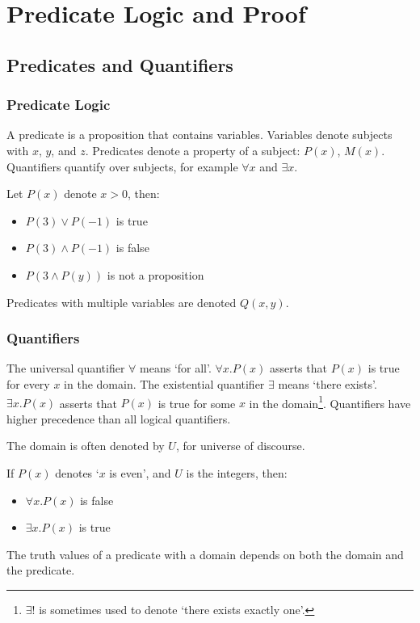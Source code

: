 \chapter{Predicate Logic and Proof}

\section{Predicates and Quantifiers}
\subsection{Predicate Logic}
A predicate is a proposition that contains variables. Variables denote subjects with \(x\), \(y\), and \(z\). Predicates denote a property of a subject: \(P(x)\), \(M(x)\). Quantifiers quantify over subjects, for example \(\forall x\) and \(\exists x\).

\begin{example}
    Let \(P(x)\) denote \(x > 0\), then:
    \begin{itemize}
        \item \(P(3) \lor P(-1)\) is true
        \item \(P(3) \land P(-1)\) is false
        \item \(P(3 \land P(y))\) is not a proposition
    \end{itemize}
\end{example}
Predicates with multiple variables are denoted \(Q(x, y)\).

\subsection{Quantifiers}
The universal quantifier \(\forall\) means `for all'. \(\forall x. P(x)\) asserts that \(P(x)\) is true for every \(x\) in the domain. The existential quantifier \(\exists\) means `there exists'. \(\exists x. P(x)\) asserts that \(P(x)\) is true for some \(x\) in the domain\footnote{\(\exists!\) is sometimes used to denote `there exists exactly one'.}. Quantifiers have higher precedence than all logical quantifiers.

The domain is often denoted by \(U\), for universe of discourse.

\begin{example}
    If \(P(x)\) denotes `\(x\) is even', and \(U\) is the integers, then:
    \begin{itemize}
        \item \(\forall x. P(x)\) is false
        \item \(\exists x. P(x)\) is true
    \end{itemize}
\end{example}
The truth values of a predicate with a domain depends on both the domain and the predicate.

